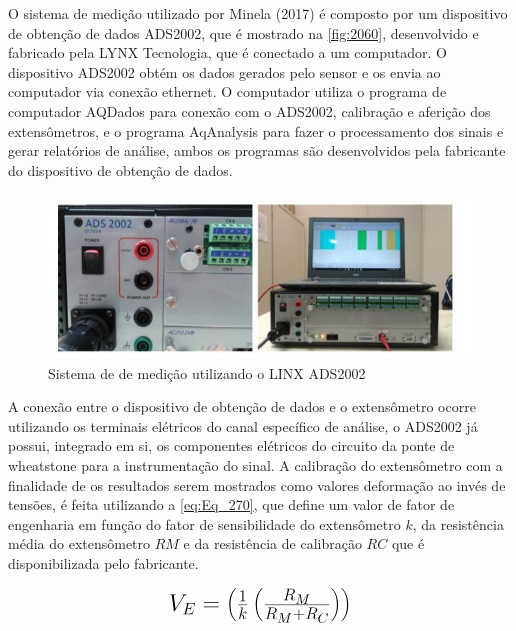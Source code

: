O sistema de medição utilizado por Minela (2017) é composto por um dispositivo de obtenção de dados ADS2002, que é mostrado na \autoref{fig:2060},
desenvolvido e fabricado pela LYNX Tecnologia, que é conectado a um computador.
O dispositivo ADS2002 obtém os dados gerados pelo sensor e os envia ao computador via conexão ethernet.
O computador utiliza o programa de computador AQDados para conexão com o ADS2002, calibração e aferição dos extensômetros, e o programa AqAnalysis para fazer o processamento dos sinais
e gerar relatórios de análise, ambos os programas são desenvolvidos pela fabricante do dispositivo de obtenção de dados.

\begin{figure}[htb]
	\caption{\label{fig:2060} Sistema de de medição utilizando o LINX ADS2002}
	\begin{center}
		\includegraphics[width=\textwidth]{pictures/2060.png}
	\end{center}
\end{figure}

A conexão entre o dispositivo de obtenção de dados e o extensômetro ocorre utilizando os terminais elétricos do canal específico de análise, o ADS2002 já possui,
integrado em si, os componentes elétricos do circuito da ponte de wheatstone para a instrumentação do sinal.
A calibração do extensômetro com a finalidade de os resultados serem mostrados como valores deformação ao invés de tensões, é feita utilizando a \autoref{eq:Eq_270}, que define um valor de
fator de engenharia em função do fator de sensibilidade do extensômetro $k$, da resistência média do extensômetro $RM$ e da resistência de calibração $RC$ que é disponibilizada pelo fabricante.

\begin{equation}\label{eq:Eq_270}%
\mbox{\fontsize{17.28}{21.6}\selectfont\( %
V_{E} = \left ( \frac{1}{k}\left ( \frac{R_{M}}{R_{M} + R_{C}} \right ) \right )
\)} %
\end{equation}

